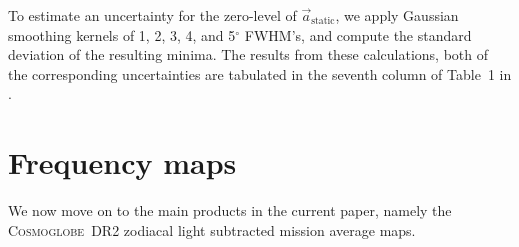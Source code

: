 \documentclass{aa}
\renewcommand{\a}[0]{\vec{a}}
\newcommand{\cosmoglobe}{\textsc{Cosmoglobe}}
\begin{document}
To estimate an uncertainty for the zero-level of
$\a_{\mathrm{static}}$, we apply Gaussian smoothing kernels of 1, 2,
3, 4, and 5$^{\circ}$ FWHM's, and compute the standard deviation of
the resulting minima. The results from these calculations, both of the
corresponding uncertainties are tabulated in the seventh column of
Table~1 in \citet{CG02_03}.





\section{Frequency maps}
\label{sec:maps}

We now move on to the main products in the current paper, namely the
\cosmoglobe\ DR2 zodiacal light subtracted mission average maps.
\end{document}
